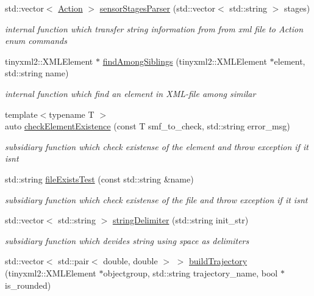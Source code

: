 \begin{DoxyCompactItemize}
std\+::vector$<$ \hyperlink{_manual_switch_obj_8h_a8bb1ef53467e4f61410d12822d922498}{Action} $>$ \hyperlink{class_level_ab61118c640a3426f77d88990a4ddc697}{sensor\+Stages\+Parser} (std\+::vector$<$ std\+::string $>$ stages)
\begin{DoxyCompactList}\small\item\em internal function which transfer string information from from xml file to Action enum commands \end{DoxyCompactList}\item 
tinyxml2\+::\+X\+M\+L\+Element $\ast$ \hyperlink{class_level_a214fb496aebd1994f8aae99bc5f6eb24}{find\+Among\+Siblings} (tinyxml2\+::\+X\+M\+L\+Element $\ast$element, std\+::string name)
\begin{DoxyCompactList}\small\item\em internal function which find an element in X\+M\+L-\/file among similar \end{DoxyCompactList}\item 
{\footnotesize template$<$typename T $>$ }\\auto \hyperlink{class_level_ada3610b170f131ef23847ca47743e0f7}{check\+Element\+Existence} (const T smf\+\_\+to\+\_\+check, std\+::string error\+\_\+msg)
\begin{DoxyCompactList}\small\item\em subsidiary function which check existense of the element and throw exception if it isn\textquotesingle{}t \end{DoxyCompactList}\item 
std\+::string \hyperlink{class_level_a1965bb306d89207706d1e9ac315ffb43}{file\+Exists\+Test} (const std\+::string \&name)
\begin{DoxyCompactList}\small\item\em subsidiary function which check existense of the file and throw exception if it isn\textquotesingle{}t \end{DoxyCompactList}\item 
std\+::vector$<$ std\+::string $>$ \hyperlink{class_level_a6aecafb8e2e9a33178c9d18d100d7261}{string\+Delimiter} (std\+::string init\+\_\+str)
\begin{DoxyCompactList}\small\item\em subsidiary function which devides string using \textquotesingle{}space\textquotesingle{} as delimiters \end{DoxyCompactList}\item 
std\+::vector$<$ std\+::pair$<$ double, double $>$ $>$ \hyperlink{class_level_ac8bdc4273913a8f0bf8523c6fe20450a}{build\+Trajectory} (tinyxml2\+::\+X\+M\+L\+Element $\ast$objectgroup, std\+::string trajectory\+\_\+name, bool $\ast$is\+\_\+rounded)

\end{DoxyCompactItemize}
